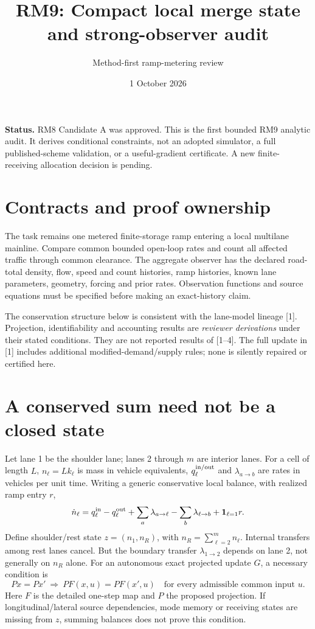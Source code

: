 \documentclass[10pt,a4paper]{article}
\title{RM9: Compact local merge state and strong-observer audit}
\author{Method-first ramp-metering review}
\date{1 October 2026}
\begin{document}
\maketitle
\noindent\textbf{Status.} RM8 Candidate A was approved. This is the first bounded
RM9 analytic audit. It derives conditional constraints, not an adopted simulator,
a full published-scheme validation, or a useful-gradient certificate.
A new finite-receiving allocation decision is pending.

\section{Contracts and proof ownership}
The task remains one metered finite-storage ramp entering a local multilane
mainline. Compare common bounded open-loop rates and count all affected traffic
through common clearance. The aggregate observer has the declared road-total
density, flow, speed and count histories, ramp histories, known lane parameters,
geometry, forcing and prior rates. Observation functions and source equations
must be specified before making an exact-history claim.

The conservation structure below is consistent with the lane-model lineage [1].
Projection, identifiability and accounting results are \emph{reviewer derivations}
under their stated conditions. They are not reported results of [1--4].
The full update in [1] includes additional modified-demand/supply rules;
none is silently repaired or certified here.

\section{A conserved sum need not be a closed state}
Let lane 1 be the shoulder lane; lanes 2 through $m$ are interior lanes.
For a cell of length $L$, $n_\ell=Lk_\ell$ is mass in vehicle equivalents,
$q^{\rm in/out}_\ell$ and $\lambda_{a\to b}$ are rates in vehicles per unit time.
Writing a generic conservative local balance, with realized ramp entry $r$,
\begin{equation}
 \dot n_\ell=q^{\rm in}_\ell-q^{\rm out}_\ell
 +\sum_a\lambda_{a\to\ell}-\sum_b\lambda_{\ell\to b}
 +\boldsymbol 1_{\ell=1}r. \label{eq:balance}
\end{equation}
Define shoulder/rest state $z=(n_1,n_R)$, with $n_R=\sum_{\ell=2}^m n_\ell$.
Internal transfers among rest lanes cancel. But the boundary transfer
$\lambda_{1\to2}$ depends on lane 2, not generally on $n_R$ alone.
For an autonomous exact projected update $G$, a necessary condition is
\begin{equation}
 P x=P x'\ \Longrightarrow\ P F(x,u)=P F(x',u)
 \quad\text{for every admissible common input }u. \label{eq:lump}
\end{equation}
Here $F$ is the detailed one-step map and $P$ the proposed projection.
If longitudinal/lateral source dependencies, mode memory or receiving states
are missing from $z$, summing balances does not prove this condition.
\end{document}
